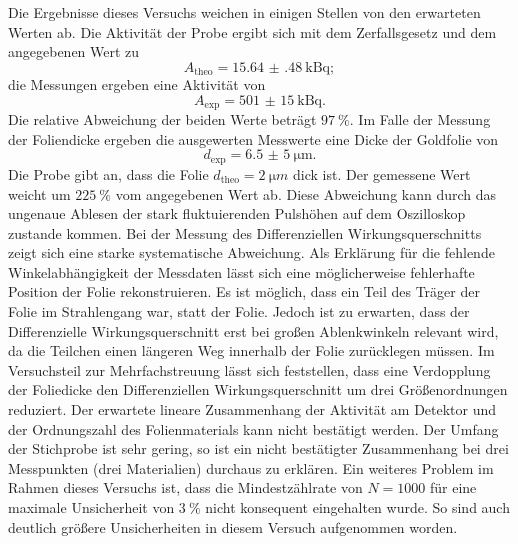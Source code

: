 %
%
Die Ergebnisse dieses Versuchs weichen in einigen Stellen von den erwarteten Werten ab.
Die Aktivität der Probe ergibt sich mit dem Zerfallsgesetz und dem angegebenen Wert zu
\begin{equation*}
	A_{\text{theo}} = \SI{15.64(48)}{\kilo\becquerel};
\end{equation*}
die Messungen ergeben eine Aktivität von
\begin{equation*}
	A_{\text{exp}}= \SI{501(15)}{\kilo\becquerel}.
\end{equation*}
Die relative Abweichung der beiden Werte beträgt $\SI{97}{\%}$.
Im Falle der Messung der Foliendicke ergeben die ausgewerten Messwerte eine Dicke der Goldfolie von
\begin{equation*}
	d_{\text{exp}}= \SI{6,5(5)}{\micro \meter}.
\end{equation*}
Die Probe gibt an, dass die Folie $d_{\text{theo}} =\SI{2}{\micro m}$ dick ist.
Der gemessene Wert weicht um $\SI{225}{\%}$ vom angegebenen Wert ab.
Diese Abweichung kann durch das ungenaue Ablesen der stark fluktuierenden Pulshöhen auf dem Oszilloskop zustande kommen.
Bei der Messung des Differenziellen Wirkungsquerschnitts zeigt sich eine starke systematische Abweichung.
Als Erklärung für die fehlende Winkelabhängigkeit der Messdaten lässt sich eine möglicherweise fehlerhafte Position der Folie rekonstruieren.
Es ist möglich, dass ein Teil des Träger der Folie im Strahlengang war, statt der Folie.
Jedoch ist zu erwarten, dass der Differenzielle Wirkungsquerschnitt erst bei großen Ablenkwinkeln relevant wird, da die Teilchen einen längeren Weg innerhalb der Folie zurücklegen müssen.
Im Versuchsteil zur Mehrfachstreuung lässt sich feststellen, dass eine Verdopplung der Foliedicke den Differenziellen Wirkungsquerschnitt um drei Größenordnungen reduziert.
Der erwartete lineare Zusammenhang der Aktivität am Detektor und der Ordnungszahl des Folienmaterials kann nicht bestätigt werden.
Der Umfang der Stichprobe ist sehr gering, so ist ein nicht bestätigter Zusammenhang bei drei Messpunkten (drei Materialien) durchaus zu erklären. 
Ein weiteres Problem im Rahmen dieses Versuchs ist, dass die Mindestzählrate von $N=1000$ für eine maximale Unsicherheit von $\SI{3}{\%}$ nicht konsequent eingehalten wurde.
So sind auch deutlich größere Unsicherheiten in diesem Versuch aufgenommen worden.
